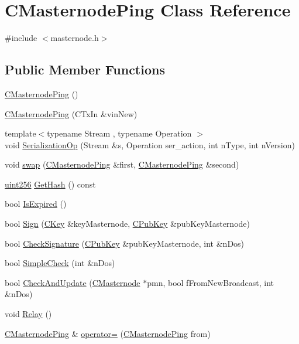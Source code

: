 \hypertarget{class_c_masternode_ping}{}\section{C\+Masternode\+Ping Class Reference}
\label{class_c_masternode_ping}


{\ttfamily \#include $<$masternode.\+h$>$}

\subsection*{Public Member Functions}
\begin{DoxyCompactItemize}
\item 
\mbox{\hyperlink{class_c_masternode_ping_a52dbadac47e4e65cba0735ef7fd1e6e0}{C\+Masternode\+Ping}} ()
\item 
\mbox{\hyperlink{class_c_masternode_ping_ac8a5d95897b478e07f9b193e8f73ffc9}{C\+Masternode\+Ping}} (C\+Tx\+In \&vin\+New)
\item 
{\footnotesize template$<$typename Stream , typename Operation $>$ }\\void \mbox{\hyperlink{class_c_masternode_ping_a5d9d08a66b63c278d0dc18e733bdc636}{Serialization\+Op}} (Stream \&s, Operation ser\+\_\+action, int n\+Type, int n\+Version)
\item 
void \mbox{\hyperlink{class_c_masternode_ping_afa95b89b426ef3b83ccc5b3f30faa3bd}{swap}} (\mbox{\hyperlink{class_c_masternode_ping}{C\+Masternode\+Ping}} \&first, \mbox{\hyperlink{class_c_masternode_ping}{C\+Masternode\+Ping}} \&second)
\item 
\mbox{\hyperlink{classuint256}{uint256}} \mbox{\hyperlink{class_c_masternode_ping_a7bbc57a875a5b9783442510aba0bf939}{Get\+Hash}} () const
\item 
bool \mbox{\hyperlink{class_c_masternode_ping_aa0727265617e87c2de770bbe7aa2c193}{Is\+Expired}} ()
\item 
bool \mbox{\hyperlink{class_c_masternode_ping_afa3eb82ae9457cc135089d83ae7719ea}{Sign}} (\mbox{\hyperlink{class_c_key}{C\+Key}} \&key\+Masternode, \mbox{\hyperlink{class_c_pub_key}{C\+Pub\+Key}} \&pub\+Key\+Masternode)
\item 
bool \mbox{\hyperlink{class_c_masternode_ping_abceb3c43f2596257fec39fa8a4669f93}{Check\+Signature}} (\mbox{\hyperlink{class_c_pub_key}{C\+Pub\+Key}} \&pub\+Key\+Masternode, int \&n\+Dos)
\item 
bool \mbox{\hyperlink{class_c_masternode_ping_a6a3869dbd3431cb5f4243726e3103f4e}{Simple\+Check}} (int \&n\+Dos)
\item 
bool \mbox{\hyperlink{class_c_masternode_ping_aea819a2b1c729374143f60b3d42e003d}{Check\+And\+Update}} (\mbox{\hyperlink{class_c_masternode}{C\+Masternode}} $\ast$pmn, bool f\+From\+New\+Broadcast, int \&n\+Dos)
\item 
void \mbox{\hyperlink{class_c_masternode_ping_a52f9892350ab8e94a63e9483f9a3b21d}{Relay}} ()
\item 
\mbox{\hyperlink{class_c_masternode_ping}{C\+Masternode\+Ping}} \& \mbox{\hyperlink{class_c_masternode_ping_aa74630c2a9d7037bd2287d8076ad621f}{operator=}} (\mbox{\hyperlink{class_c_masternode_ping}{C\+Masternode\+Ping}} from)
\end{DoxyCompactItemize}
